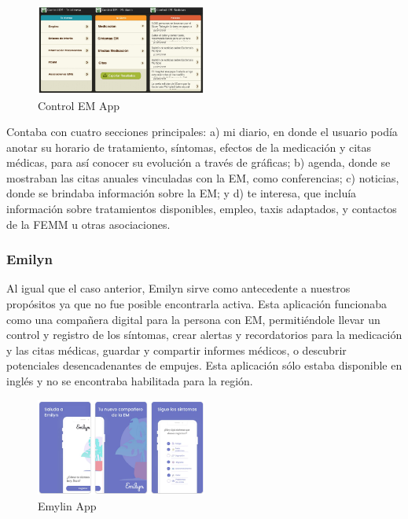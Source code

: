 \begin{figure}[h]
    \centering
    \includegraphics[width=0.5\textwidth]{img/mercado/control_em.png}
    \caption{Control EM App} \label{Img:Control+EM+APP}
\end{figure} 

Contaba con cuatro secciones principales: a) mi diario, en donde el usuario podía anotar su horario de tratamiento, síntomas, efectos de la medicación y citas médicas, para así conocer su evolución a través de gráficas; b) agenda, donde se mostraban las citas anuales vinculadas con la EM, como conferencias; c) noticias, donde se brindaba información sobre la EM; y d) te interesa, que incluía información sobre tratamientos disponibles, empleo, taxis adaptados, y contactos de la FEMM u otras asociaciones.

\subsubsection{Emilyn}

Al igual que el caso anterior, Emilyn sirve como antecedente a nuestros propósitos ya que no fue posible encontrarla activa. Esta aplicación funcionaba como una compañera digital para la persona con EM, permitiéndole llevar un control y registro de los síntomas, crear alertas y recordatorios para la medicación y las citas médicas, guardar y compartir informes médicos, o descubrir potenciales desencadenantes de empujes. Esta aplicación sólo estaba disponible en inglés y no se encontraba habilitada para la región.

\begin{figure}[h]
    \centering
    \includegraphics[width=0.5\textwidth]{img/mercado/emylin.png}
    \caption{Emylin App} \label{Img:Emilyn+APP}
\end{figure} 

